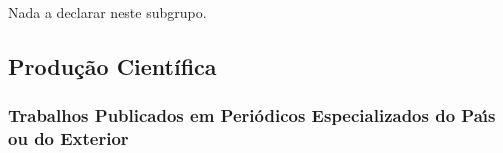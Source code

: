 \documentclass[a4paper,oneside,10pt]{article}
\begin{document}
Nada a declarar neste subgrupo.

%
%


\subsection{Produção Científica}
\vspace{0.3cm}


\subsubsection{Trabalhos Publicados em Peri\'{o}dicos Especializados do Pa\'{\i}s ou do Exterior}
\vspace{0.3cm}
\end{document}
